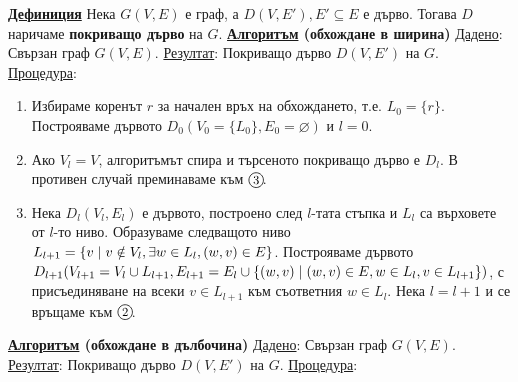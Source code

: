 \documentclass{article}
\begin{document}
\textbf{\underline{Дефиниция}}
Нека $G(V, E)$ е граф, а $D(V, E'), E' \subseteq E$ е дърво. Тогава $D$ наричаме \textbf{покриващо дърво} на $G$. \newline\newline
\textbf{\underline{Алгоритъм} (обхождане в ширина)} \newline\newline
\underline{Дадено}: Свързан граф $G(V, E)$. \newline
\underline{Резултат}: Покриващо дърво $D(V, E')$ на $G$. \newline
\underline{Процедура}:
\begin{enumerate}[label=\protect\circled{\arabic*}]
    \item Избираме коренът $r$ за начален връх на обхождането, т.е. $L_0 = \{r\}$. Построяваме дървото
    $D_0(V_0 = \{L_0\}, E_0 = \varnothing)$ и $l = 0$.
    \item Ако $V_l = V$, алгоритъмът спира и търсеното покриващо дърво е $D_l$. В противен случай преминаваме към $\circled{3}$.
    \item Нека $D_l(V_l, E_l)$ е дървото, построено след $l$-тата стъпка и $L_l$ са върховете от $l$-то ниво. Образуваме
    следващото ниво $L_{l+1} = \{v \hspace{0.1cm} | \hspace{0.1cm} v \notin V_l, \exists w \in L_l, (w, v) \in E\}$. Построяваме дървото $D_{l+1}
    (V_{l+1} = V_l \cup L_{l+1}, E_{l+1} = E_l \cup \{(w, v) \hspace{0.1cm} | \hspace{0.1cm} (w, v) \in E, w \in L_l, v \in L_{l+1}\})$, с присъединяване
    на всеки $v \in L_{l+1}$ към съответния $w \in L_l$. Нека $l = l + 1$ и се връщаме към $\circled{2}$.
\end{enumerate}
\textbf{\underline{Алгоритъм} (обхождане в дълбочина)} \newline\newline
\underline{Дадено}: Свързан граф $G(V, E)$. \newline
\underline{Резултат}: Покриващо дърво $D(V, E')$ на $G$. \newline
\underline{Процедура}:
\end{document}
